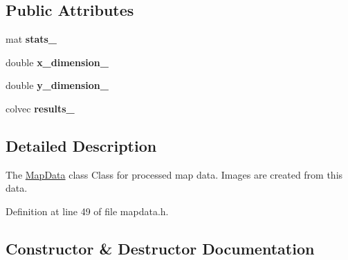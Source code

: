 \subsection*{Public Attributes}
\begin{DoxyCompactItemize}
\item 
mat {\bfseries stats\+\_\+}\hypertarget{class_map_data_a25748ed400f0e0fff2cb3fd70074a8de}{}\label{class_map_data_a25748ed400f0e0fff2cb3fd70074a8de}

\item 
double {\bfseries x\+\_\+dimension\+\_\+}\hypertarget{class_map_data_a605938fe04909b1147ed36b43a74292d}{}\label{class_map_data_a605938fe04909b1147ed36b43a74292d}

\item 
double {\bfseries y\+\_\+dimension\+\_\+}\hypertarget{class_map_data_ae730473a1d211f29a29727b03463edc0}{}\label{class_map_data_ae730473a1d211f29a29727b03463edc0}

\item 
colvec {\bfseries results\+\_\+}\hypertarget{class_map_data_a395c613ef1240dea250d2fa7df5d4d47}{}\label{class_map_data_a395c613ef1240dea250d2fa7df5d4d47}

\end{DoxyCompactItemize}


\subsection{Detailed Description}
The \hyperlink{class_map_data}{Map\+Data} class Class for processed map data. Images are created from this data. 

Definition at line 49 of file mapdata.\+h.



\subsection{Constructor \& Destructor Documentation}
